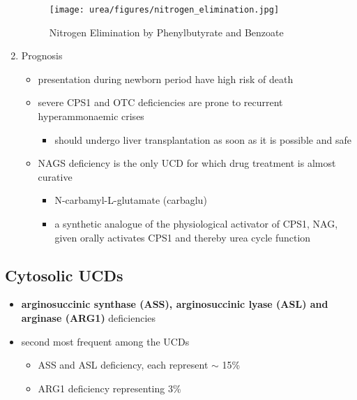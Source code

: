 \documentclass[12pt]{scrartcl}
\begin{document}
\begin{center}
\begin{center}
\begin{enumerate}
\begin{figure}[htbp]
\centering
\texttt{[image: urea/figures/nitrogen\_elimination.jpg]}
\caption{\label{fig:orgbf59b2b}Nitrogen Elimination by Phenylbutyrate and Benzoate}
\end{figure}

\item Prognosis
\label{sec:org18e7071}
\begin{itemize}
\item presentation during newborn period have high risk of death
\item severe CPS1 and OTC deficiencies are prone to recurrent
hyperammonaemic crises
\begin{itemize}
\item should undergo liver transplantation as soon as it is possible and
safe
\end{itemize}
\item NAGS deficiency is the only UCD for which drug treatment is almost
curative
\begin{itemize}
\item N-carbamyl-L-glutamate (carbaglu)
\item a synthetic analogue of the physiological activator of CPS1, NAG,
given orally activates CPS1 and thereby urea cycle function
\end{itemize}
\end{itemize}
\end{enumerate}

\subsection{Cytosolic UCDs}
\label{sec:org535b522}
\begin{itemize}
\item \textbf{arginosuccinic synthase (ASS), arginosuccinic lyase (ASL) and arginase (ARG1)} deficiencies
\item second most frequent among the UCDs
\begin{itemize}
\item ASS and ASL deficiency, each represent \(\sim\) 15\%
\item ARG1 deficiency representing 3\%
\end{itemize}
\end{itemize}


\end{center}
\end{center}
\end{document}
